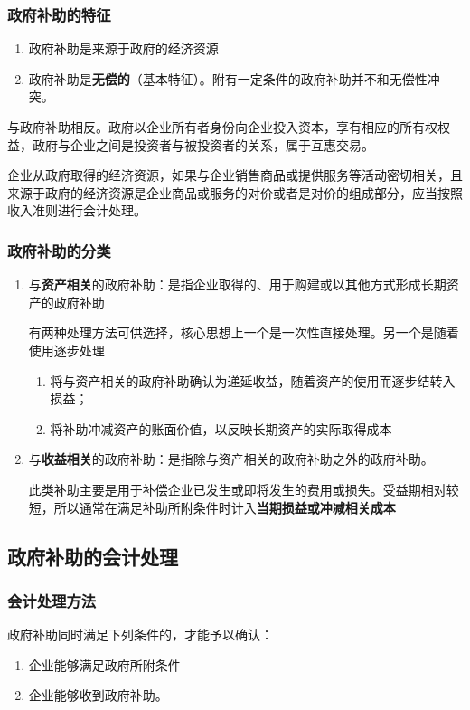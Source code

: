 \documentclass[UTF8,12pt]{ctexart}
\numberwithin{equation}{section} %
\numberwithin{figure}{section}
\numberwithin{table}{section}
\begin{document}
	\subsubsection{政府补助的特征}
	\begin{enumerate}
		\item 政府补助是来源于政府的经济资源
		
		\item 政府补助是\textbf{无偿的}（基本特征）。附有一定条件的政府补助并不和无偿性冲突。
	\end{enumerate}
	
	与政府补助相反。政府以企业所有者身份向企业投入资本，享有相应的所有权权益，政府与企业之间是投资者与被投资者的关系，属于互惠交易。
	
	企业从政府取得的经济资源，如果与企业销售商品或提供服务等活动密切相关，且来源于政府的经济资源是企业商品或服务的对价或者是对价的组成部分，应当按照收入准则进行会计处理。
	
	\subsubsection{政府补助的分类}
	\begin{enumerate}
		\item 与\textbf{资产相关}的政府补助：是指企业取得的、用于购建或以其他方式形成长期资产的政府补助
		
		有两种处理方法可供选择，核心思想上一个是一次性直接处理。另一个是随着使用逐步处理
		\begin{enumerate}
			\item 将与资产相关的政府补助确认为递延收益，随着资产的使用而逐步结转入损益；
			
			\item 将补助冲减资产的账面价值，以反映长期资产的实际取得成本
		\end{enumerate}
		
		\item 与\textbf{收益相关}的政府补助：是指除与资产相关的政府补助之外的政府补助。
		
		此类补助主要是用于补偿企业已发生或即将发生的费用或损失。受益期相对较短，所以通常在满足补助所附条件时计入\textbf{当期损益或冲减相关成本}
	\end{enumerate}
	
	\subsection{政府补助的会计处理}
	\subsubsection{会计处理方法}
	政府补助同时满足下列条件的，才能予以确认：
	\begin{enumerate}
		\item 企业能够满足政府所附条件
		
		\item 企业能够收到政府补助。
	\end{enumerate}
	
\end{document}
